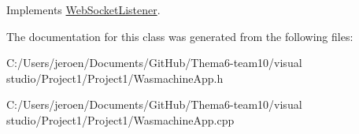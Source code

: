 Implements \hyperlink{class_web_socket_listener_a2e3faecac88f46180ce5250d9727b210}{Web\+Socket\+Listener}.



The documentation for this class was generated from the following files\+:\begin{DoxyCompactItemize}
\item 
C\+:/\+Users/jeroen/\+Documents/\+Git\+Hub/\+Thema6-\/team10/visual studio/\+Project1/\+Project1/Wasmachine\+App.\+h\item 
C\+:/\+Users/jeroen/\+Documents/\+Git\+Hub/\+Thema6-\/team10/visual studio/\+Project1/\+Project1/Wasmachine\+App.\+cpp\end{DoxyCompactItemize}
